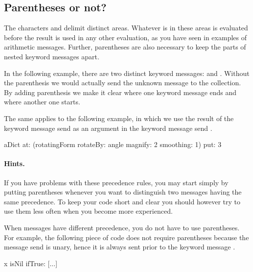 \documentclass[a4paper,10pt,twoside]{book}
\begin{document}
\subsection{Parentheses or not?}
The characters \ct{[]} and \ct{()} delimit distinct areas.
Whatever is in these areas is evaluated before the result is used in any other evaluation, as you have seen in examples of arithmetic messages.
Further, parentheses are also necessary to keep the parts of nested keyword messages apart.

In the following example, there are two distinct keyword messages:  and .
Without the parenthesis we would actually send the unknown message  to the collection.
By adding parenthesis we make it clear where one keyword message ends and where another one starts.


The same applies to the following example, in which we use the result of the keyword message send  as an argument in the keyword message send .

\begin{code}{}
aDict
   at: (rotatingForm 
           rotateBy: angle	
           magnify: 2 
           smoothing: 1)
   put: 3
\end{code}

\paragraph{Hints.}
If you have problems with these precedence rules, you may start simply by putting parentheses whenever you want to distinguish two messages having the same precedence.
To keep your code short and clear you should however try to use them less often when you become more experienced.

When messages have different precedence, you do not have to use parentheses.
For example, the following piece of code does not require parentheses because the message send  is unary, hence it is always sent prior to the keyword message .
\begin{code}{}
x isNil ifTrue: [...]
\end{code}

\end{document}
